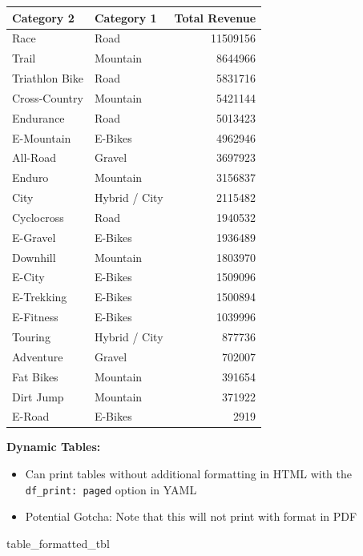 \documentclass[
]{article}
\newenvironment{Shaded}{\begin{snugshade}}{\end{snugshade}}
\newcommand{\NormalTok}[1]{#1}
\providecommand{\tightlist}{%
  \setlength{\itemsep}{0pt}\setlength{\parskip}{0pt}}
\begin{document}
\begin{longtable}[]{@{}llr@{}}
\toprule()
Category 2 & Category 1 & Total Revenue \\
\midrule()
\endhead
Race & Road & 11509156 \\
Trail & Mountain & 8644966 \\
Triathlon Bike & Road & 5831716 \\
Cross-Country & Mountain & 5421144 \\
Endurance & Road & 5013423 \\
E-Mountain & E-Bikes & 4962946 \\
All-Road & Gravel & 3697923 \\
Enduro & Mountain & 3156837 \\
City & Hybrid / City & 2115482 \\
Cyclocross & Road & 1940532 \\
E-Gravel & E-Bikes & 1936489 \\
Downhill & Mountain & 1803970 \\
E-City & E-Bikes & 1509096 \\
E-Trekking & E-Bikes & 1500894 \\
E-Fitness & E-Bikes & 1039996 \\
Touring & Hybrid / City & 877736 \\
Adventure & Gravel & 702007 \\
Fat Bikes & Mountain & 391654 \\
Dirt Jump & Mountain & 371922 \\
E-Road & E-Bikes & 2919 \\
\bottomrule()
\end{longtable}

\textbf{Dynamic Tables:}

\begin{itemize}
\tightlist
\item
  Can print tables without additional formatting in HTML with the
  \texttt{df\_print:\ paged} option in YAML
\item
  Potential Gotcha: Note that this will not print with format in PDF
\end{itemize}

\begin{Shaded}
\begin{Highlighting}[]
\NormalTok{table\_formatted\_tbl}
\end{Highlighting}
\end{Shaded}
\end{document}
